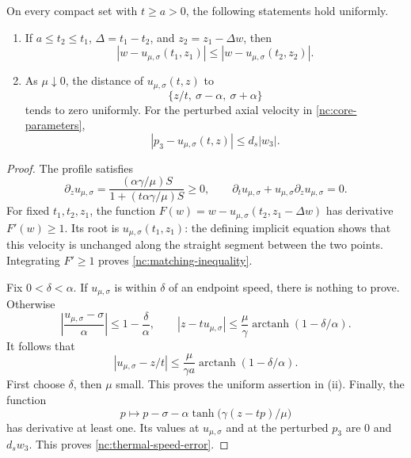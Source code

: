 \begin{lemma}
\label{nc:characteristic-matching}
On every compact set with \(t\ge a>0\), the following statements
hold uniformly.
\begin{enumerate}[label=\textup{(\roman*)}]
\item If \(a\le t_2\le t_1\), \(\Delta=t_1-t_2\), and
\(z_2=z_1-\Delta w\), then
\begin{equation}
\label{nc:matching-inequality}
 |w-u_{\mu,\sigma}(t_1,z_1)|
 \le |w-u_{\mu,\sigma}(t_2,z_2)|.
\end{equation}
\item As \(\mu\downarrow0\), the distance of
\(u_{\mu,\sigma}(t,z)\) to
\[
 \{z/t,\ \sigma-\alpha,\ \sigma+\alpha\}
\]
tends to zero uniformly.  For the perturbed axial velocity in
\eqref{nc:core-parameters},
\begin{equation}
\label{nc:thermal-speed-error}
 |p_3-u_{\mu,\sigma}(t,z)|\le d_s|w_3|.
\end{equation}
\end{enumerate}
\end{lemma}

\begin{proof}
The profile satisfies
\[
 \partial_z u_{\mu,\sigma}
 =\frac{(\alpha\gamma/\mu)S}
        {1+(t\alpha\gamma/\mu)S}\ge0,
 \qquad
 \partial_tu_{\mu,\sigma}
       +u_{\mu,\sigma}\partial_zu_{\mu,\sigma}=0.
\]
For fixed \(t_1,t_2,z_1\), the function
\(F(w)=w-u_{\mu,\sigma}(t_2,z_1-\Delta w)\) has derivative
\(F'(w)\ge1\).  Its root is
\(u_{\mu,\sigma}(t_1,z_1)\): the defining implicit equation shows
that this velocity is unchanged along the straight segment between
the two points.  Integrating \(F'\ge1\) proves
\eqref{nc:matching-inequality}.

Fix \(0<\delta<\alpha\).  If \(u_{\mu,\sigma}\) is within
\(\delta\) of an endpoint speed, there is nothing to prove.
Otherwise
\[
 \left|\frac{u_{\mu,\sigma}-\sigma}{\alpha}\right|
 \le1-\frac{\delta}{\alpha},
 \qquad
 |z-tu_{\mu,\sigma}|
 \le\frac{\mu}{\gamma}
       \operatorname{arctanh}(1-\delta/\alpha).
\]
It follows that
\[
 |u_{\mu,\sigma}-z/t|
 \le\frac{\mu}{\gamma a}
       \operatorname{arctanh}(1-\delta/\alpha).
\]
First choose \(\delta\), then \(\mu\) small.  This proves the
uniform assertion in (ii).
Finally, the function
\[
 p\longmapsto p-\sigma-\alpha\tanh\bigl(\gamma(z-tp)/\mu\bigr)
\]
has derivative at least one.  Its values at \(u_{\mu,\sigma}\)
and at the perturbed \(p_3\) are \(0\) and \(d_sw_3\).
This proves \eqref{nc:thermal-speed-error}.
\end{proof}

